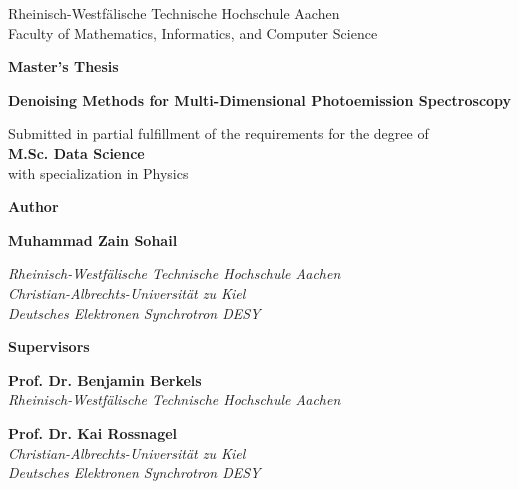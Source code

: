\begin{titlepage}
    \begin{center}
        \Large
        Rheinisch-Westfälische Technische Hochschule Aachen \\
        Faculty of Mathematics, Informatics, and Computer Science
        
        \vspace{1.2cm}
        
        \Huge
        \textbf{Master's Thesis}
            
        \vspace{0.8cm}
        
        \LARGE
        \textbf{Denoising Methods for Multi-Dimensional Photoemission Spectroscopy}
        
        \vspace{1cm}
        
        \normalsize
        Submitted in partial fulfillment of the requirements for the degree of \\
        \textbf{M.Sc. Data Science}\\
        with specialization in Physics
        
        \vspace{1cm}
        
        \large
        \textbf{Author} 

        \vspace{0.5cm}

        \textbf{Muhammad Zain Sohail}

        \normalsize
        \textit{Rheinisch-Westfälische Technische Hochschule Aachen} \\
        \textit{Christian-Albrechts-Universität zu Kiel} \\
        \textit{Deutsches Elektronen Synchrotron DESY}
        
        \vspace{1.5cm}
        
        \large
        \textbf{Supervisors}
        
        \vspace{0.5cm}
        
        \textbf{Prof. Dr. Benjamin Berkels} \\
        \textit{Rheinisch-Westfälische Technische Hochschule Aachen}
        
        \vspace{0.3cm}
        
        \textbf{Prof. Dr. Kai Rossnagel} \\
        \textit{Christian-Albrechts-Universität zu Kiel} \\
        \textit{Deutsches Elektronen Synchrotron DESY}
        

\end{center}
\end{titlepage}
